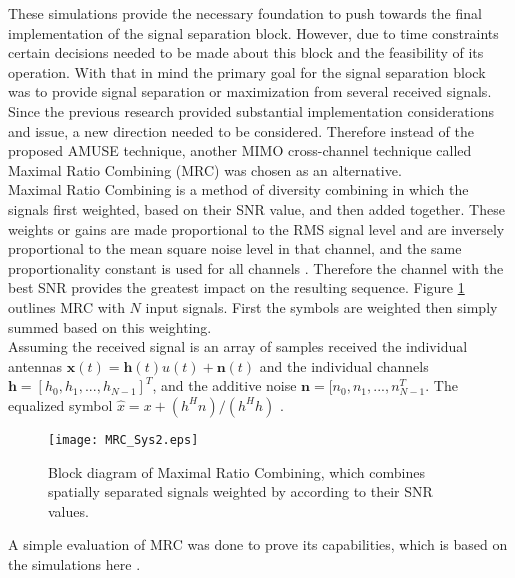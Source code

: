 


These simulations provide the necessary foundation to push towards the final implementation of the signal separation block.  However, due to time constraints certain decisions needed to be made about this block and the feasibility of its operation.  With that in mind the primary goal for the signal separation block was to provide signal separation or maximization from several received signals.  Since the previous research provided substantial implementation considerations and issue, a new direction needed to be considered.  Therefore instead of the proposed AMUSE \cite{AMUSE} technique, another MIMO cross-channel technique called Maximal Ratio Combining (MRC) was chosen as an alternative.\\

Maximal Ratio Combining is a method of diversity combining in which the signals first weighted, based on their SNR value, and then added together.  These weights or gains are made proportional to the RMS signal level and are inversely proportional to the mean square noise level in that channel, and the same proportionality constant is used for all channels \cite{fs1037c}.  Therefore the channel with the best SNR provides the greatest impact on the resulting sequence. Figure \ref{fig:MRC} outlines MRC with \(N\) input signals.  First the symbols are weighted then simply summed based on this weighting.\\

Assuming the received signal is an array of samples received the individual antennas \(\boldsymbol{x}(t)=\boldsymbol{h}(t)u(t)+\boldsymbol{n}(t)\) and the individual channels \(\boldsymbol{h}=[h_{0},h_{1},...,h_{N-1}]^{T}\), and the additive noise \(\boldsymbol{n}=[n_{0},n_{1},...,n_{N-1}^{T}\).  The equalized symbol \(\hat{x}=x+(h^{H}n)/(h^{H}h) \) \cite{diversity}.

\begin{figure}[!ht]\centering
\texttt{[image: MRC\_Sys2.eps]}
\caption{Block diagram of Maximal Ratio Combining, which combines spatially separated signals weighted by according to their SNR values.}
\label{fig:MRC}
\end{figure}


A simple evaluation of MRC was done to prove its capabilities, which is based on the simulations here \cite{mrc_m}.

